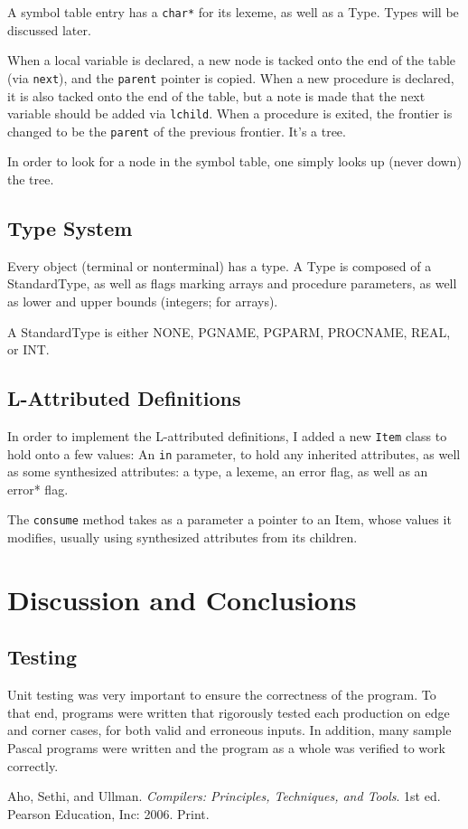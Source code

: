 \documentclass[titlepage]{article}
\begin{document}
		A symbol table entry has a \texttt{char*} for its lexeme, as well as a Type. Types will be discussed later.

		When a local variable is declared, a new node is tacked onto the end of the table (via \texttt{next}), and the \texttt{parent} pointer is copied. When a new procedure is declared, it is also tacked onto the end of the table, but a note is made that the next variable should be added via \texttt{lchild}. When a procedure is exited, the frontier is changed to be the \texttt{parent} of the previous frontier. It's a tree.

		In order to look for a node in the symbol table, one simply looks up (never down) the tree.

		\subsection{Type System}
		Every object (terminal or nonterminal) has a type. A Type is composed of a StandardType, as well as flags marking arrays and procedure parameters, as well as lower and upper bounds (integers; for arrays).

		A StandardType is either NONE, PGNAME, PGPARM, PROCNAME, REAL, or INT.

		\subsection{L-Attributed Definitions}
		In order to implement the L-attributed definitions, I added a new \texttt{Item} class to hold onto a few values: An \texttt{in} parameter, to hold any inherited attributes, as well as some synthesized attributes: a type, a lexeme, an error flag, as well as an error* flag.

		The \texttt{consume} method takes as a parameter a pointer to an Item, whose values it modifies, usually using synthesized attributes from its children.
	\section{Discussion and Conclusions}
		\subsection{Testing}
		Unit testing was very important to ensure the correctness of the program. To that end, programs were written that rigorously tested each production on edge and corner cases, for both valid and erroneous inputs. In addition, many sample Pascal programs were written and the program as a whole was verified to work correctly.
	\begin{thebibliography}{9}
			Aho, Sethi, and Ullman.
			\emph{Compilers: Principles, Techniques, and Tools}.
			1st ed.
			Pearson Education, Inc: 2006. Print.
	\end{thebibliography}
	\appendix
\end{document}
